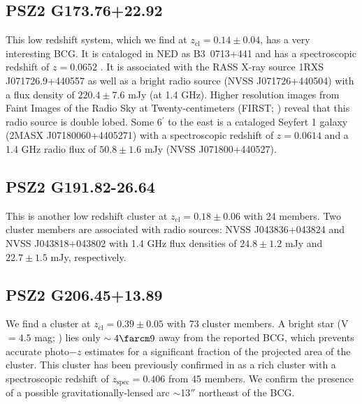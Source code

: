 \documentclass[apj, revtex4-1]{emulateapj}
\newcommand{\editorial}[1]{\textcolor{red}{#1}}
\begin{document}
\subsection{PSZ2 G173.76+22.92} %
This low redshift system, which we find at $z_\mathrm{cl} = 0.14 \pm 0.04$, has a very interesting BCG. It is cataloged in NED as \hbox{B3 0713+441} and has a spectroscopic redshift of $z=0.0652$ \citep{Bauer2000}. It is associated with the RASS X-ray source 1RXS J071726.9+440557 as well as a bright radio source (NVSS J071726+440504) with a flux density of $220.4\pm 7.6$ mJy (at 1.4 GHz). Higher resolution images from Faint Images of the Radio Sky at Twenty-centimeters (FIRST; \citealt{Becker1995}) reveal that this radio source is double lobed. Some 6$^\prime$ to the east is a cataloged Seyfert 1 galaxy (2MASX J07180060+4405271) with a spectroscopic redshift of $z=0.0614$ \citep{Michel1988} and a 1.4 GHz radio flux of $50.8 \pm 1.6 $ mJy (NVSS J071800+440527).




\subsection{PSZ2 G191.82-26.64} %
This is another low redshift cluster at $z_\mathrm{cl} = 0.18 \pm 0.06$ with 24 members. Two cluster members are associated with radio sources: NVSS J043836+043824 and NVSS J043818+043802 with 1.4 GHz flux densities of $24.8 \pm 1.2$ mJy and $22.7 \pm 1.5$ mJy, respectively.

\subsection{PSZ2 G206.45+13.89} %
We find a cluster at $z_\mathrm{cl} = 0.39 \pm 0.05$ with 73 cluster members. A bright star (V $= 4.5$ mag; \citealt{Hog2000}) lies only $\sim4\farcm9$ away from the reported BCG, which prevents accurate photo$-z$ estimates for a significant fraction of the projected area of the cluster. This cluster has been previously confirmed in \citet{Barrena2018} as a rich cluster with a spectroscopic redshift of $z_\mathrm{spec} = 0.406$ from 45 members. We confirm the presence of a possible gravitationally-lensed arc $\sim$13$''$ northeast of the BCG.
\end{document}
